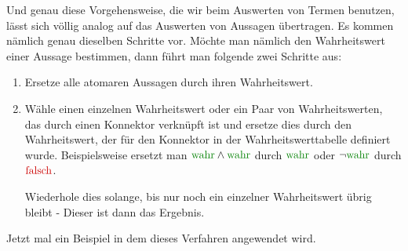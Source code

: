 \documentclass[../../main.tex]{subfiles}
\begin{document}
Und genau diese Vorgehensweise, die wir beim Auswerten von Termen benutzen, lässt sich völlig analog auf das Auswerten von Aussagen übertragen. 
Es kommen nämlich genau dieselben Schritte vor. Möchte man nämlich den Wahrheitswert einer Aussage bestimmen, dann führt man folgende zwei Schritte aus:
\begin{enumerate}
    \item Ersetze alle atomaren Aussagen durch ihren Wahrheitswert.
    \item Wähle einen einzelnen Wahrheitswert oder ein Paar von Wahrheitswerten, das durch einen Konnektor verknüpft ist und ersetze dies durch den Wahrheitswert, der für den Konnektor in der Wahrheitswerttabelle definiert wurde. 
    Beispielsweise ersetzt man $\wahr \land \wahr$ durch $\wahr$ oder $\neg \wahr$ durch $\falsch$.
    
    Wiederhole dies solange, bis nur noch ein einzelner Wahrheitswert übrig bleibt - Dieser ist dann das Ergebnis.
\end{enumerate}Jetzt mal ein Beispiel in dem dieses Verfahren angewendet wird.
\end{document}
